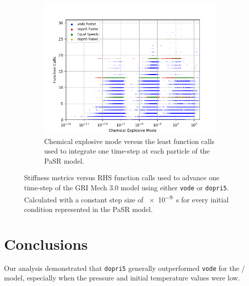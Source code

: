 \documentclass[12pt]{ussci}
\begin{document}
\begin{figure}[htbp]
\begin{subfigure}{0.43\textwidth}
       \label{fig:SI2GRIPaSR}
   \end{subfigure}
   \begin{subfigure}{0.43\textwidth}
       \includegraphics[width=\linewidth]{GRI_Mech_3/PaSR_Fn_Work_CEMA_Groupings_1e-09.png}
       \caption{Chemical explosive mode versus the least function calls used to integrate one time-step at each particle of the PaSR model.}
       \label{fig:CEMGRIPaSR}
   \end{subfigure}
   \caption{Stiffness metrics versus RHS function calls used to advance one time-step of the GRI Mech 3.0 model using either \texttt{vode} or \texttt{dopri5}.  Calculated with a constant step size of \SI{e-9}{\second} for every initial condition represented in the PaSR model.}
   \label{fig:GRIPaSRStiffness}
\end{figure}


\section{Conclusions}

Our analysis demonstrated that \texttt{dopri5} generally outperformed \texttt{vode} for the \slash {} model, especially when the pressure and initial temperature values were low.
%
\end{document}
